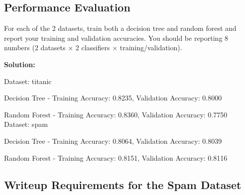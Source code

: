 \documentclass{article}
\newenvironment{solution}{\color{blue} \smallskip \textbf{Solution:}}{}
\begin{document}
\newpage
\subsection{\bf Performance Evaluation}
For each of the 2 datasets, train both a decision tree and random forest and report your training and validation accuracies. 
You should be reporting 8 numbers (2 datasets $\times$ 2 classifiers $\times$ training/validation).

\begin{solution}

Dataset: titanic

Decision Tree - Training Accuracy: 0.8235, Validation Accuracy: 0.8000

Random Forest - Training Accuracy: 0.8360, Validation Accuracy: 0.7750\\

Dataset: spam

Decision Tree - Training Accuracy: 0.8064, Validation Accuracy: 0.8039

Random Forest - Training Accuracy: 0.8151, Validation Accuracy: 0.8116






\end{solution}

\newpage
\subsection{Writeup Requirements for the Spam Dataset}
\end{document}
